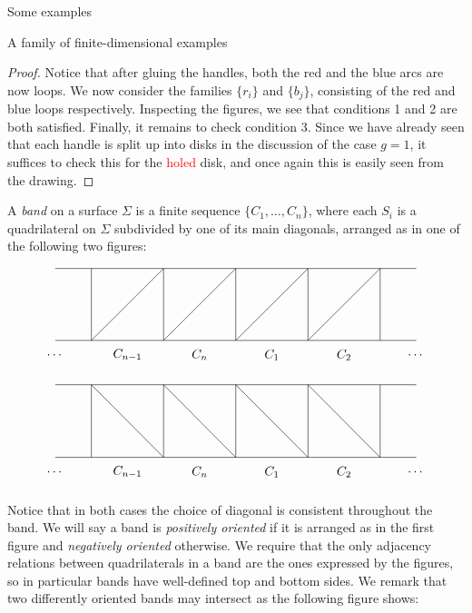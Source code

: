 \begin{chapter}{Some examples}
\begin{section}{A family of finite-dimensional examples}
\begin{proof}
Notice that after gluing the handles, both the red and the blue arcs are now loops. We now consider the families $\{r_i\}$ and $\{b_j\}$, consisting of the red and blue loops respectively. Inspecting the figures, we see that conditions 1 and 2 are both satisfied. Finally, it remains to check condition 3. Since we have already seen that each handle is split up into disks in the discussion of the case $g=1$, it suffices to check this for the \textcolor{red}{holed} disk, and once again this is easily seen from the drawing.
\end{proof}


A \emph{band} on a surface $\Sigma$ is a finite sequence $\{C_1, \dots, C_n\}$, where each $S_i$ is a quadrilateral on $\Sigma$ subdivided by one of its main diagonals, arranged as in one of the following two figures:

\[
\begin{tikzpicture}
\draw (-5,1) -- (5,1);
\draw (-5,-1) -- (5,-1);

\foreach \x in {-4,-2,...,4}
\draw (\x,1) -- (\x,-1);

\foreach \x in {-4,-2,...,2}
\draw (\x,-1) -- (\x+2, 1);

\node at (-5,-1.4) {$\dots$};
\node at (-3,-1.4) {$C_{n-1}$};
\node at (-1,-1.4) {$C_{n}$};
\node at (1,-1.4) {$C_{1}$};
\node at (3,-1.4) {$C_{2}$};
\node at (5,-1.4) {$\dots$};
\end{tikzpicture}
\]

\[
\begin{tikzpicture}
\draw (-5,1) -- (5,1);
\draw (-5,-1) -- (5,-1);

\foreach \x in {-4,-2,...,4}
\draw (\x,1) -- (\x,-1);

\foreach \x in {-4,-2,...,2}
\draw (\x,1) -- (\x+2, -1);

\node at (-5,-1.4) {$\dots$};
\node at (-3,-1.4) {$C_{n-1}$};
\node at (-1,-1.4) {$C_{n}$};
\node at (1,-1.4) {$C_{1}$};
\node at (3,-1.4) {$C_{2}$};
\node at (5,-1.4) {$\dots$};
\end{tikzpicture}
\]

Notice that in both cases the choice of diagonal is consistent throughout the band. We will say a band is \emph{positively oriented} if it is arranged as in the first figure and \emph{negatively oriented} otherwise. We require that the only adjacency relations between quadrilaterals in a band are the ones expressed by the figures, so in particular bands have well-defined top and bottom sides. We remark that two differently oriented bands may intersect as the following figure shows:


\end{section}
\end{chapter}
